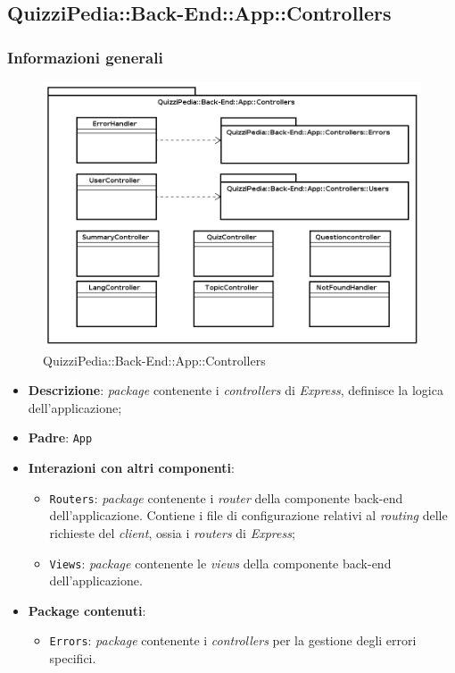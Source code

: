 \subsection{QuizziPedia::Back-End::App::Controllers}
\subsubsection{Informazioni generali}
\label{QuizziPedia::Back-End::App::Controllers}
\begin{figure}[ht]
	\centering
	\includegraphics[scale=0.45]{UML/Package/QuizziPedia_Back-End_App_Controllers.png}
	\caption{QuizziPedia::Back-End::App::Controllers}
\end{figure}
\FloatBarrier
	\begin{itemize}
		\item \textbf{Descrizione}:
		\textit{package} contenente i \textit{controllers} di \textit{Express}, definisce la logica dell'applicazione;
		\item \textbf{Padre}: \texttt{App}
		\item \textbf{Interazioni con altri componenti}:
			\begin{itemize}
				\item \texttt{Routers}:
				\textit{package} contenente i \textit{router} della componente back-end dell'applicazione. Contiene i file di configurazione relativi al \textit{routing} delle richieste del \textit{client}, ossia i \textit{routers} di \textit{Express};
				\item \texttt{Views}:
				\textit{package} contenente le \textit{views} della componente back-end dell'applicazione.
			\end{itemize}
		\item \textbf{Package contenuti}:
			\begin{itemize}
				\item \texttt{Errors}:
				\textit{package} contenente i \textit{controllers} per la gestione degli errori specifici.
			\end{itemize}
	\end{itemize}
